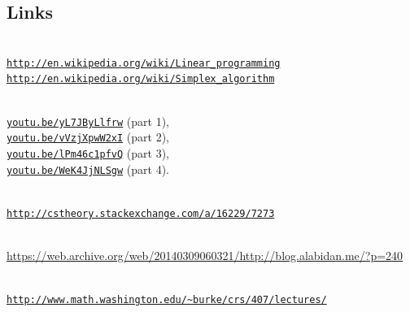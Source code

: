\documentclass[11pt,oneside]{article}
\begin{document}
		
	\subsection{Links}

		 \\
		\href{http://en.wikipedia.org/wiki/Linear_programming}{\texttt{http://en.wikipedia.org/wiki/Linear\_programming}} \\ 
		\href{http://en.wikipedia.org/wiki/Simplex_algorithm}{\texttt{http://en.wikipedia.org/wiki/Simplex\_algorithm}}

		\medskip
		 \\
		\href{https://youtu.be/yL7JByLlfrw} 
			{\texttt{youtu.be/yL7JByLlfrw}} (part 1), \\
		\href{https://youtu.be/vVzjXpwW2xI}
			{\texttt{youtu.be/vVzjXpwW2xI}} (part 2), \\
		\href{https://youtu.be/lPm46c1pfvQ}
			{\texttt{youtu.be/lPm46c1pfvQ}} (part 3),  \\
		\href{https://youtu.be/WeK4JjNLSgw}
			{\texttt{youtu.be/WeK4JjNLSgw}} (part 4).


		\medskip
		 \\
		\href{http://cstheory.stackexchange.com/a/16229/7273}
			{\texttt{http://cstheory.stackexchange.com/a/16229/7273}}

		\medskip
		 \\ 
		\href{https://web.archive.org/web/20140309060321/http://blog.alabidan.me/?p=240}
			{https://web.archive.org/web/20140309060321/http://blog.alabidan.me/?p=240}

		\medskip
		 \\
		\href{http://www.math.washington.edu/~burke/crs/407/lectures/}
	            {\texttt{http://www.math.washington.edu/\textasciitilde{}burke/crs/407/lectures/}}
\end{document}
